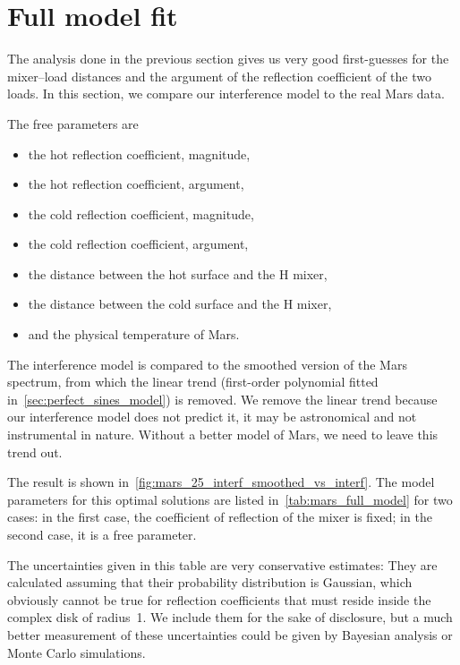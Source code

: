 \FloatBarrier



\section{Full model fit}
The analysis done in the previous section gives us very good first-guesses for the mixer--load distances and the argument of the reflection coefficient of the two loads.
In this section, we compare our interference model to the real Mars data.

The free parameters are
\begin{itemize}
    \item the hot reflection coefficient, magnitude,
    \item the hot reflection coefficient, argument,
    \item the cold reflection coefficient, magnitude,
    \item the cold reflection coefficient, argument,
    \item the distance between the hot surface and the H mixer,
    \item the distance between the cold surface and the H mixer,
    \item and the physical temperature of Mars.
\end{itemize}

The interference model is compared to the smoothed version of the Mars spectrum, from which the linear trend (first-order polynomial fitted in~\cref{sec:perfect_sines_model}) is removed.
We remove the linear trend because our interference model does not predict it, it may be astronomical and not instrumental in nature.
Without a better model of Mars, we need to leave this trend out.

The result is shown in~\cref{fig:mars_25_interf_smoothed_vs_interf}.
The model parameters for this optimal solutions are listed in~\cref{tab:mars_full_model} for two cases:
in the first case, the coefficient of reflection of the mixer is fixed;
in the second case, it is a free parameter.

The uncertainties given in this table are very conservative estimates:
They are calculated assuming that their probability distribution is Gaussian, which obviously cannot be true for reflection coefficients that must reside inside the complex disk of radius~1.
We include them for the sake of disclosure, but a much better measurement of these uncertainties could be given by Bayesian analysis or Monte Carlo simulations.

